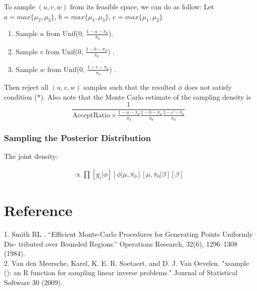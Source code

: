 \documentclass[11 pt, a4paper]{article}  %
\begin{document}
To sample $(u,v,w)$ from its feasible space, we can do as follow:
Let $a = max\{\mu_2,\mu_3\}$, $b = max\{\mu_1,\mu_3\}$, $c = max\{\mu_1,\mu_2\}$
\begin{enumerate}
\item Sample $u$ from Unif($0$, $\frac{1-a-\pi_0}{\pi_0}$).
\item Sample $v$ from Unif($0$, $\frac{1-b-\pi_0}{\pi_0}$) .
\item Sample $w$ from Unif($0$, $\frac{1-c-\pi_0}{\pi_0}$) .
\end{enumerate}
Then reject all $(u,v,w)$ samples such that the resulted  $\phi$ does not satisfy condition (*). Also note that the Monte Carlo estimate of the sampling density is 
\[\frac{1}{\text{AcceptRatio}\times \frac{1-a-\pi_0}{\pi_0}\frac{1-b-\pi_0}{\pi_0}\frac{1-c-\pi_0}{\pi_0}}\]

\newpage

\subsubsection{Sampling the Posterior Distribution}

The joint density:

\begin{align*}
[y, \phi, \mu, \pi_0, \beta] \propto \prod [y_i|\phi] [\phi|\mu, \pi_0][\mu, \pi_0|\beta] [\beta]
\end{align*}



%


\newpage
\section*{Reference}
1. Smith RL . “Efficient Monte-Carlo Procedures for Generating Points Uniformly Dis- tributed over Bounded Regions.” Operations Research, 32(6), 1296–1308 (1984).\\ 
2. Van den Meersche, Karel, K. E. R. Soetaert, and D. J. Van Oevelen. "xsample (): an R function for sampling linear inverse problems." Journal of Statistical Software 30 (2009).
\end{document}
